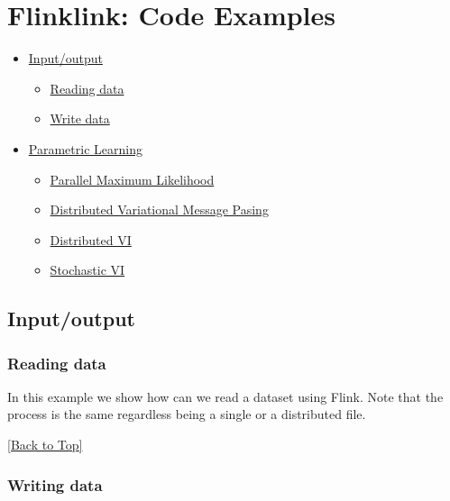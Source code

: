\documentclass[10pt,a4paper]{article}
\newcommand{\includejavasource}[1]{}
\begin{document}
\section{Flinklink: Code Examples}\label{sec:flinklink}

\begin{itemize}
	\item \hyperref[sec:flinklink:io]{Input/output}
	\begin{itemize}
		\item \hyperref[sec:flinklink:io:read]{Reading data}
		\item \hyperref[sec:flinklink:io:write]{Write data}
	\end{itemize}
		\item \hyperref[sec:flinklink:learning]{Parametric Learning}
	\begin{itemize}
		\item \hyperref[sec:flinklink:learning:pml]{Parallel Maximum Likelihood}
		\item \hyperref[sec:flinklink:learning:dvmp]{Distributed Variational Message Pasing}
		\item \hyperref[sec:flinklink:learning:dvi]{Distributed VI}
		\item \hyperref[sec:flinklink:learning:svi]{Stochastic VI}
	\end{itemize}
\end{itemize}
\subsection{Input/output}\label{sec:flinklink:io}




\subsubsection{Reading data}\label{sec:flinklink:io:read}

In this example we show how can we read a dataset using Flink. Note that the process is the same regardless being a single or a distributed file.

\includejavasource{../../../../examples/src/main/java/eu/amidst/flinklink/examples/io/DataStreamLoaderExample.java}


\hyperref[sec:flinklink]{[Back to Top]}\newline 


\subsubsection{Writing data}\label{sec:flinklink:io:write}
\end{document}
